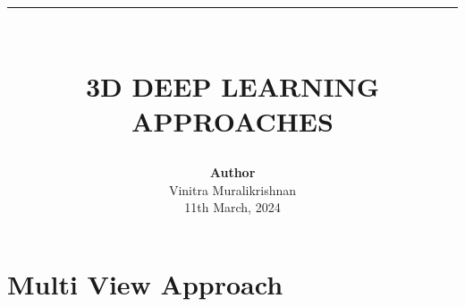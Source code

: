 \documentclass{article}
\newcommand{\HRule}[1]{\rule{\linewidth}{#1}}
\theoremstyle{definition}
\theoremstyle{remark}
\begin{document}

\title{ \normalsize \textsc{}
		\\ [2.0cm]
		\HRule{1.5pt} \\
		\LARGE \textbf{\uppercase{3D Deep Learning Approaches}
        \vspace*{10\baselineskip}}
		}
\date{}
\author{\textbf{Author} \\ 
		Vinitra Muralikrishnan \\
		11th March, 2024}

\maketitle
\newpage

\tableofcontents
\newpage


\section{Multi View Approach}
\end{document}
